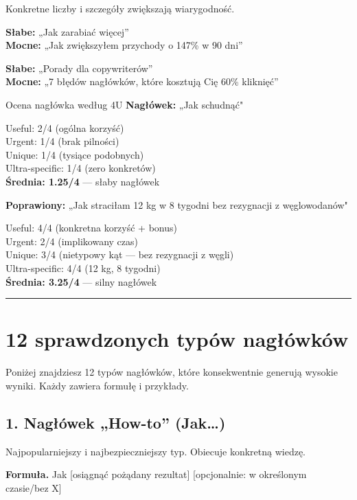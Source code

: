 \documentclass[
  12pt,
  a4paper,
  twoside,
  openright,
  12pt,
  DIV=12,
  BCOR=12mm]{scrbook}
\newcommand{\decoline}{%
  \begin{center}
    \textcolor{bordergray}{\rule{0.3\textwidth}{0.5pt}}
  \end{center}
}
\begin{document}
Konkretne liczby i szczegóły zwiększają wiarygodność.

\textbf{Słabe:} „Jak zarabiać więcej''\\
\textbf{Mocne:} „Jak zwiększyłem przychody o 147\% w 90 dni''

\textbf{Słabe:} „Porady dla copywriterów''\\
\textbf{Mocne:} „7 błędów nagłówków, które kosztują Cię 60\% kliknięć''

\begin{przyklad}{Ocena nagłówka według 4U}
\textbf{Nagłówek:} „Jak schudnąć"

Useful: 2/4 (ogólna korzyść)\\
Urgent: 1/4 (brak pilności)\\
Unique: 1/4 (tysiące podobnych)\\
Ultra-specific: 1/4 (zero konkretów)\\
\textbf{Średnia: 1.25/4} --- słaby nagłówek

\textbf{Poprawiony:} „Jak straciłam 12 kg w 8 tygodni bez rezygnacji z węglowodanów"

Useful: 4/4 (konkretna korzyść + bonus)\\
Urgent: 2/4 (implikowany czas)\\
Unique: 3/4 (nietypowy kąt --- bez rezygnacji z węgli)\\
Ultra-specific: 4/4 (12 kg, 8 tygodni)\\
\textbf{Średnia: 3.25/4} --- silny nagłówek
\end{przyklad}

\decoline

\section{12 sprawdzonych typów
nagłówków}\label{sprawdzonych-typuxf3w-nagux142uxf3wkuxf3w}

Poniżej znajdziesz 12 typów nagłówków, które konsekwentnie generują
wysokie wyniki. Każdy zawiera formułę i przykłady.

\subsection{1. Nagłówek „How-to''
(Jak\ldots)}\label{nagux142uxf3wek-how-to-jak}

Najpopularniejszy i najbezpieczniejszy typ. Obiecuje konkretną wiedzę.

\textbf{Formuła.} Jak {[}osiągnąć pożądany rezultat{]} {[}opcjonalnie: w
określonym czasie/bez X{]}
\end{document}
